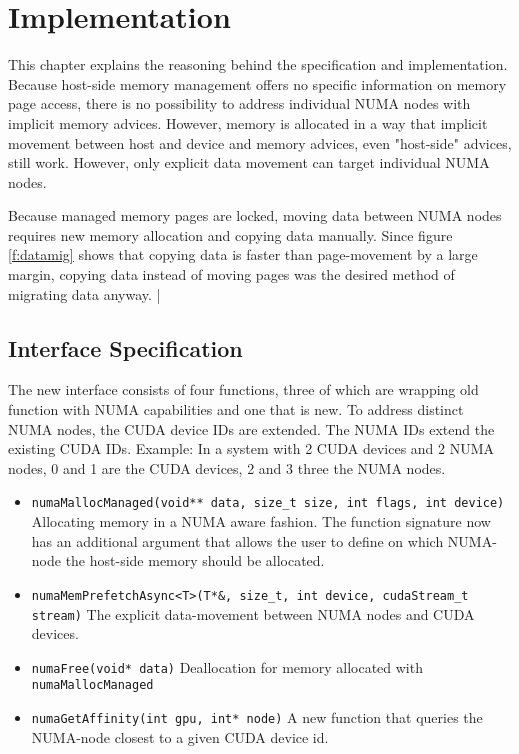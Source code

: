 \chapter{Implementation}\label{c:impl}

This chapter explains the reasoning behind the specification and implementation.
Because host-side memory management offers no specific information on memory page access, there is no possibility to address individual NUMA nodes with
implicit memory advices. However, memory is allocated in a way that implicit movement between host and device and memory advices, even "host-side" advices,
still work. However, only explicit data movement can target individual NUMA nodes.

Because managed memory pages are locked, moving data between NUMA nodes requires
new memory allocation and copying data manually.
Since figure \ref{f:datamig} shows that copying data is faster
than page-movement by a large margin, copying data instead of moving pages was the desired method of migrating
data anyway.
\lstMakeShortInline[columns=fixed]|

\section{Interface Specification}
The new interface consists of four functions, three of which are wrapping old function with NUMA
capabilities and one that is new. To address distinct NUMA nodes, the CUDA device IDs are extended. The NUMA IDs extend the existing CUDA IDs. Example: In a system with 2 CUDA devices and 2 NUMA nodes, 0 and 1 are the CUDA devices, 2 and 3 three the NUMA nodes.
\begin{itemize}
\item \lstinline[columns=fixed]{numaMallocManaged(void** data, size_t size, int flags, int device)}
	\newline Allocating memory in a NUMA aware fashion. The function signature now has an additional argument that allows the user to define on which NUMA-node the host-side memory should be allocated.
\item \lstinline[columns=fixed]{numaMemPrefetchAsync<T>(T*&, size_t, int device, cudaStream_t stream)} 
	\newline The explicit data-movement between NUMA nodes and CUDA devices.
\item \lstinline[columns=fixed]{numaFree(void* data)}
	\newline Deallocation for memory allocated with \verb|numaMallocManaged|
\item \lstinline[columns=fixed]{numaGetAffinity(int gpu, int* node)}
	\newline A new function that queries the NUMA-node closest to a given CUDA device id.
\end{itemize} 

